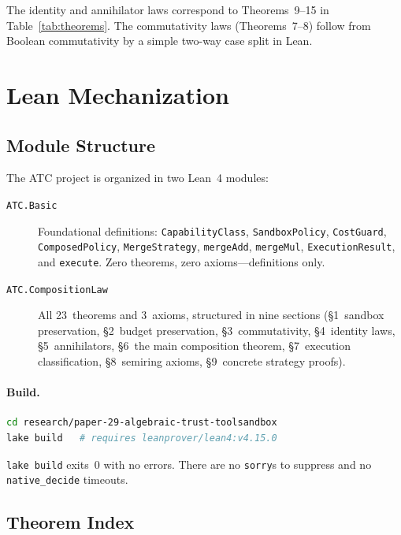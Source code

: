 \documentclass[sigconf]{acmart}
\newcommand{\ATC}{\textsc{ATC}}
\begin{document}
The identity and annihilator laws correspond to Theorems~9--15 in
Table~\ref{tab:theorems}.  The commutativity laws (Theorems~7--8) follow from
Boolean commutativity by a simple two-way case split in Lean.

\section{Lean Mechanization}
\label{sec:lean}

\subsection{Module Structure}

The \ATC{} project is organized in two Lean~4 modules:

\begin{description}
  \item[\texttt{ATC.Basic}]  Foundational definitions: \texttt{CapabilityClass},
    \texttt{SandboxPolicy}, \texttt{CostGuard}, \texttt{ComposedPolicy},
    \texttt{MergeStrategy}, \texttt{mergeAdd}, \texttt{mergeMul},
    \texttt{ExecutionResult}, and \texttt{execute}.  Zero theorems, zero
    axioms---definitions only.

  \item[\texttt{ATC.CompositionLaw}]  All 23~theorems and 3~axioms,
    structured in nine sections (\S1~sandbox preservation, \S2~budget
    preservation, \S3~commutativity, \S4~identity laws, \S5~annihilators,
    \S6~the main composition theorem, \S7~execution classification,
    \S8~semiring axioms, \S9~concrete strategy proofs).
\end{description}

\paragraph{Build.}

\begin{lstlisting}[language=bash,numbers=none,frame=none]
cd research/paper-29-algebraic-trust-toolsandbox
lake build   # requires leanprover/lean4:v4.15.0
\end{lstlisting}

\noindent
\texttt{lake build} exits~0 with no errors.  There are no \texttt{sorry}s to
suppress and no \texttt{native\_decide} timeouts.

\subsection{Theorem Index}
\end{document}
